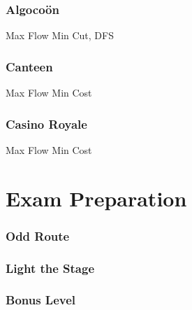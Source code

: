 \documentclass[10pt,a4paper,twoside]{report}
\begin{document}
\newpage
\subsection*{Algoco\"on}
\begin{keywords}Max Flow Min Cut, DFS\end{keywords}


\newpage
\subsection*{Canteen}
\begin{keywords}Max Flow Min Cost\end{keywords}


\newpage
\subsection*{Casino Royale}
\begin{keywords}Max Flow Min Cost\end{keywords}



\chapter{Exam Preparation}

\subsection*{Odd Route}
\begin{keywords}\end{keywords}


\newpage
\subsection*{Light the Stage}
\begin{keywords}\end{keywords}


\newpage
\subsection*{Bonus Level}
\begin{keywords}\end{keywords}

\end{document}
